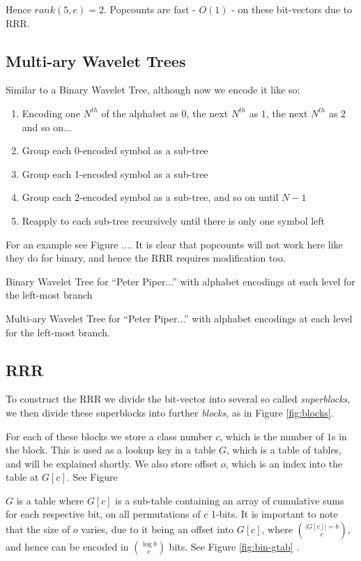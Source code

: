Hence $rank(5, e) = 2$. Popcounts are fast - $O(1)$ - on these bit-vectors due
to RRR.


\subsection{Multi-ary Wavelet Trees}
Similar to a Binary Wavelet Tree, although now we encode it like so:

\begin{enumerate}
    \item Encoding one $N^{th}$ of the alphabet as $0$, the next $N^{th}$ as $1$,
    the next $N^{th}$ as $2$ and so on...
    \item Group each 0-encoded symbol as a sub-tree
    \item Group each 1-encoded symbol as a sub-tree
    \item Group each 2-encoded symbol as a sub-tree, and so on until $N-1$
    \item Reapply to each sub-tree recursively until there is only one symbol
    left
\end{enumerate}
For an example see Figure .... It is clear that popcounts will not work
here like they do for binary, and hence the RRR requires modification too.

			{Binary Wavelet Tree for ``Peter Piper...'' with alphabet
			encodings at each level for the left-most branch}
		
			{Multi-ary Wavelet Tree for ``Peter Piper...'' with alphabet
			encodings at each level for the left-most branch.}



\subsection{RRR}
To construct the RRR we divide the bit-vector into several so called \emph{superblocks}, we then divide these superblocks into further \emph{blocks}, as in Figure \ref{fig:blocks}.

For each of these blocks we store a class number $c$, which is the number of $1$s in the block. This is used as a lookup key in a table $G$, which is a table of tables, and will be explained shortly. We also store offset $o$, which is an index into the table at $G[c]$. See Figure%

$G$ is a table where $G[c]$ is a sub-table containing an array of cumulative sums for each respective bit, on all permutations of $c$ 1-bits. It is important to note that the size of $o$ varies, due to it being an offset into $G[c]$, where $|G[c]| = b \choose c$, and hence can be encoded in $\log b \choose c$ bits. See Figure \ref{fig:bin-gtab} .

